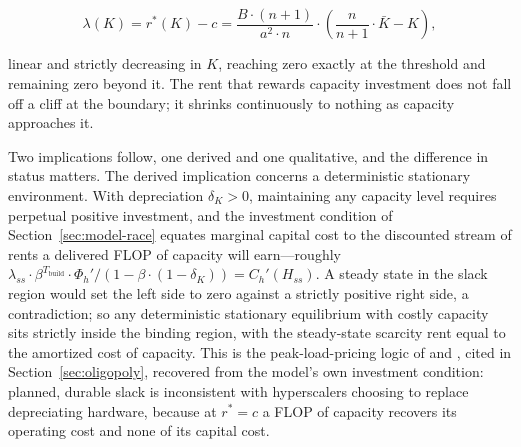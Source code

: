 \documentclass[11pt]{article}
\begin{document}
\begin{equation}\lambda(K)=r^{*}(K)-c=\frac{B\cdot(n+1)}{a^{2}\cdot n}\cdot\left(\frac{n}{n+1}\cdot\bar K-K\right),\end{equation}

linear and strictly decreasing in $K$, reaching zero exactly at the threshold and remaining zero beyond it. The rent that rewards capacity investment does not fall off a cliff at the boundary; it shrinks continuously to nothing as capacity approaches it.

Two implications follow, one derived and one qualitative, and the difference in status matters. The derived implication concerns a deterministic stationary environment. With depreciation $\delta_K>0$, maintaining any capacity level requires perpetual positive investment, and the investment condition of Section~\ref{sec:model-race} equates marginal capital cost to the discounted stream of rents a delivered FLOP of capacity will earn---roughly $\lambda_{ss}\cdot\beta^{T_{\mathrm{build}}}\cdot\Phi_h'/\left(1-\beta\cdot(1-\delta_K)\right)=C_h'(H_{ss})$. A steady state in the slack region would set the left side to zero against a strictly positive right side, a contradiction; so any deterministic stationary equilibrium with costly capacity sits strictly inside the binding region, with the steady-state scarcity rent equal to the amortized cost of capacity. This is the peak-load-pricing logic of \citet{boiteux1960} and \citet{crewKleindorfer1976}, cited in Section~\ref{sec:oligopoly}, recovered from the model's own investment condition: planned, durable slack is inconsistent with hyperscalers choosing to replace depreciating hardware, because at $r^{*}=c$ a FLOP of capacity recovers its operating cost and none of its capital cost.
\end{document}
